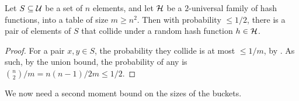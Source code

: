 \begin{lemma}
    Let $S \subseteq \mathcal{U}$ be a set of $n$ elements, and let $\mathcal{H}$ be a
    $2$-universal family of hash functions, into a table of size
    $m \geq n^2$. Then with probability $\leq 1/2$, there is a pair
    of elements of $S$ that collide under a random hash function $h
    \in \mathcal{H}$.
\end{lemma}
\begin{proof}
    For a pair $x, y \in S$, the probability they collide is at most
    $\leq 1/m$, by . As such, by the
    union bound, the probability of any  is
    $\binom{n}{2}/m = n(n-1)/2m \leq 1/2$.
\end{proof}

We now need a second moment bound on the sizes of the buckets.

